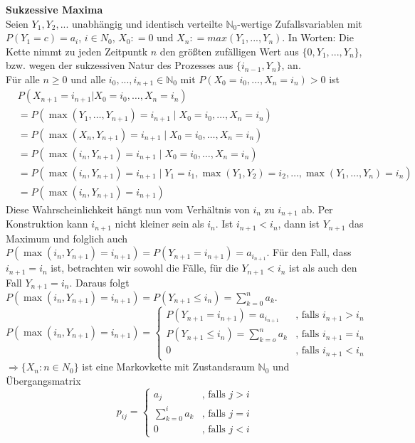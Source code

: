 \documentclass[a4paper,12pt]{article}
\begin{document}
\begin{tcolorbox}[breakable, colframe=blue, colback=white, title=Beispiel 4]
	\textbf{Sukzessive Maxima}\\
	Seien $Y_1, Y_2, ...$ unabhängig und identisch verteilte $\mathbb{N}_0$-wertige Zufallsvariablen mit $P(Y_1 = c) = a_i$, $i \in N_0$, $X_0: = 0$ und $X_n: = max(Y_1, ..., Y_n)$.
	In Worten: Die Kette nimmt zu jeden Zeitpuntk $n$ den größten zufälligen Wert aus $\{0,Y_1, ..., Y_n\}$, bzw. wegen der sukzessiven Natur des Prozesses
	aus $\{i_{n-1},Y_n\}$, an.\\
	Für alle $n \geq 0$ und alle $i_0, ..., i_{n+1} \in \mathbb{N}_0$ mit $P(X_0 = i_0, ..., X_n = i_n) > 0$ ist
	\begin{align*}
		 & P(X_{n+1} = i_{n+1} | X_0 = i_0, \dots, X_n = i_n)                                                          \\
		 & =  P(\max(Y_1, \dots, Y_{n+1}) = i_{n+1} \mid X_0 = i_0, \dots, X_n = i_n)                                  \\
		 & =  P(\max(X_n, Y_{n+1}) = i_{n+1} \mid X_0 = i_0, \dots, X_n = i_n)                                         \\
		 & =  P(\max(i_n, Y_{n+1}) = i_{n+1} \mid X_0 = i_0, \dots, X_n = i_n)                                         \\
		 & =  P(\max(i_n, Y_{n+1}) = i_{n+1} \mid Y_1 = i_1, \max(Y_1, Y_2) = i_2, \dots, \max(Y_1, \dots, Y_n) = i_n) \\
		 & =  P(\max(i_n, Y_{n+1}) = i_{n+1})
	\end{align*}
	Diese Wahrscheinlichkeit hängt nun vom Verhältnis von $i_n$ zu $i_{n+1}$ ab. Per Konstruktion kann $i_{n+1}$ nicht kleiner sein als $i_n$.
	Ist $i_{n+1} < i_n$, dann ist $Y_{n+1}$ das Maximum und folglich auch $P(\max(i_n, Y_{n+1}) = i_{n+1}) =P(Y_{n+1}= i_{n+1})= a_{i_{n+1}}$. Für den Fall,
	dass $i_{n+1} = i_n$ ist, betrachten wir sowohl die Fälle, für die $Y_{n+1} < i_n$ ist als auch den Fall $Y_{n+1} = i_n$. Daraus folgt
	$P(\max(i_n, Y_{n+1}) = i_{n+1}) = P(Y_{n+1} \leq i_n) = \sum_{k=0}^{n}a_k $.
	$$
		P(\max(i_n, Y_{n+1}) = i_{n+1})= \begin{cases}
			P(Y_{n+1}=i_{n+1}) = a_{i_{n+1}}        & \text{, falls } i_{n+1} > i_n \\
			P(Y_{n+1} \leq i_n) = \sum_{k=o}^{n}a_k & \text{, falls } i_{n+1} = i_n \\
			0                                       & \text{, falls } i_{n+1} < i_n
		\end{cases}
	$$
	$\Rightarrow \{X_n: n \in N_0 \}$ ist eine Markovkette mit Zustandsraum $\mathbb{N}_0$ und Übergangsmatrix
	$$
		p_{ij} = \begin{cases}
			a_j               & \text{, falls } j>i \\
			\sum_{k=0}^{i}a_k & \text{, falls } j=i \\
			0                 & \text{, falls } j<i
		\end{cases}
	$$
\end{tcolorbox}
\end{document}
